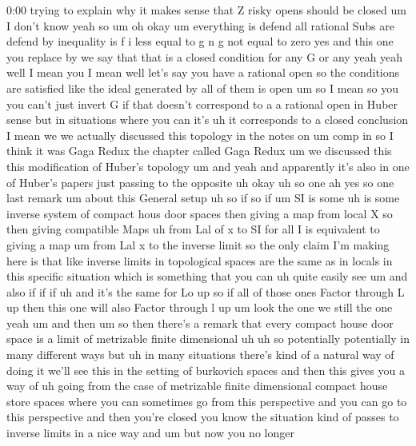 \begin{unfinished}{0:00}
trying  to  explain  why  it  makes  sense
that  Z  risky  opens  should  be  closed  um  I
don't  know
yeah  so
um  oh  okay  um  everything  is  defend  all
rational  Subs  are  defend  by  inequality
is  f  i  less  equal  to  g  n  g  not  equal  to
zero  yes  and  this  one  you  replace  by  we
say  that  that  is  a  closed
condition  for  any  G  or  any  yeah  yeah
well  I  mean  you  I  mean  well  let's  say
you  have  a  rational  open  so  the
conditions  are  satisfied  like  the  ideal
generated  by  all  of  them  is
open  um  so  I  mean  so  you  you  can't  just
invert  G  if  that  doesn't  correspond  to  a
a  rational  open  in  Huber  sense  but  in
situations  where  you  can  it's  uh  it
corresponds  to  a  closed  conclusion  I
mean  we  we  actually  discussed  this
topology  in  the  notes  on  um  comp
in  so  I  think  it  was  Gaga  Redux  the
chapter  called  Gaga
Redux  um  we  discussed  this  this
modification  of  Huber's
topology  um  and  yeah  and  apparently  it's
also  in  one  of  Huber's  papers  just
passing  to  the
opposite  uh  okay
uh  so  one  ah  yes
so  one  last
remark
um  about  this  General
setup
uh  so
if  so  if  um  SI  is  some
uh  is  some  inverse
system  of  compact  hous  door
spaces  then  giving  a  map  from  local  X  so
then  giving  compatible
Maps  uh  from  Lal  of  x  to  SI  for  all  I  is
equivalent  to  giving  a  map  um  from  Lal  x
to  the  inverse
limit  so  the  only  claim  I'm  making  here
is  that  like  inverse  limits  in
topological  spaces  are  the  same  as  in
locals  in  this  specific  situation  which
is  something  that  you  can  uh  quite
easily  see  um  and  also  if  if  if  uh  and
it's  the  same  for  Lo
up  so  if  all  of  those  ones  Factor
through  L  up  then  this  one  will  also
Factor  through  l
up
um
look  the  one  we  still  the  one
yeah
um  and  then  um  so  then  there's  a  remark
that  every  compact  house  door
space  is  a
limit  of  metrizable  finite
dimensional
uh  uh  so  potentially  potentially  in  many
different
ways  but  uh  in  many  situations  there's
kind  of  a  natural  way  of  doing  it  we'll
see  this  in  the  setting  of  burkovich
spaces  and  then  this  gives  you  a  way  of
uh  going  from  the  case  of  metrizable
finite  dimensional  compact  house  store
spaces  where  you  can
sometimes  go  from  this  perspective  and
you  can  go  to  this  perspective  and  then
you're  closed  you  know  the  situation
kind  of  passes  to  inverse  limits  in  a
nice  way  and  um  but  now  you  no  longer

\end{unfinished}
